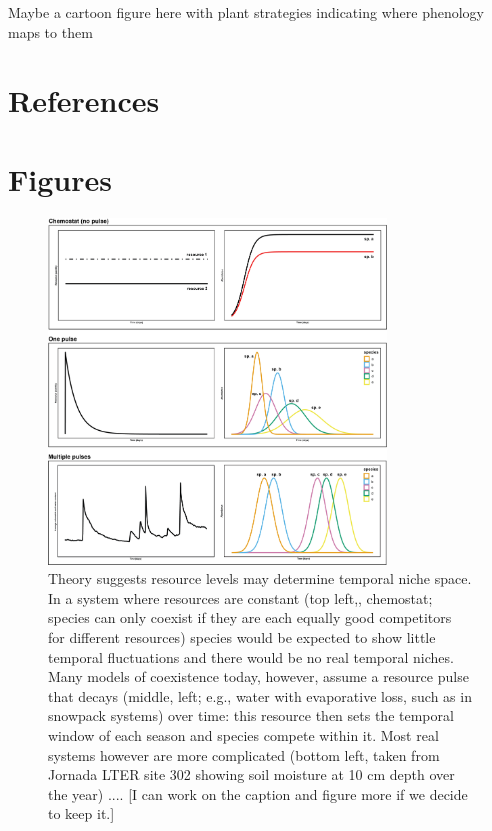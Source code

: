 \documentclass[11pt]{article}
\begin{document}
Maybe a cartoon figure here with plant strategies indicating where phenology maps to them


\newpage
\section{References}


\newpage
\section{Figures}


\begin{figure}[h!]
\centering
\includegraphics[width=0.8\textwidth]{..//figures/JN_conceptfigs/sixpanel_concept.png}
\caption{Theory suggests resource levels may determine temporal niche space. In a system where resources are constant (top left,, chemostat; species can only coexist if they are each equally good competitors for different resources) species would be expected to show little temporal fluctuations and there would be no real temporal niches. Many models of coexistence today, however, assume a resource pulse that decays (middle, left; e.g., water with evaporative loss, such as in snowpack systems) over time: this resource then sets the temporal window of each season and species compete within it. Most real systems however are more complicated (bottom left, taken from Jornada LTER site 302 showing soil moisture at 10 cm depth over the year) .... [I can work on the caption and figure more if we decide to keep it.]} 
 \label{fig:resource}
\end{figure}
\end{document}
